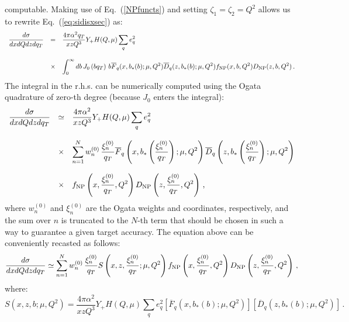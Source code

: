 \documentclass[10pt,a4paper]{article}
\begin{document}
computable. Making use of Eq.~(\ref{NPfuncts}) and setting
$\zeta_1=\zeta_2=Q^2$ allows us to rewrite Eq.~(\ref{eq:sidisxsec})
as:
\begin{equation}
\begin{array}{rcl}
\displaystyle   \frac{d\sigma}{dxdQdz d q_{T}} &=&\displaystyle
\frac{4\pi \alpha^2q_{T}}{xzQ^3}Y_+ H(Q,\mu) \sum_q e_q^2\\
\\
&\times&\displaystyle 
  \int_0^\infty db\, J_0\left(bq_T\right) \,b\overline{F}_q(x,b_*(b);\mu,Q^2) \overline{D}_q(z,b_*(b);\mu,Q^2) f_{\rm NP}(x,b,Q^2) D_{\rm NP}(z,b,Q^2)\,.
\end{array}
\label{eq:sidisxsec3}
\end{equation}
The integral in the r.h.s. can be numerically computed using the Ogata
quadrature of zero-th degree (because $J_0$ enters the integral):
\begin{equation}
\begin{array}{rcl}
\displaystyle   \frac{d\sigma}{dxdQdz d q_{T}} &\simeq&\displaystyle
\frac{4\pi \alpha^2}{xzQ^3}Y_+ H(Q,\mu) \sum_q e_q^2\\
\\
&\times&\displaystyle
  \sum_{n=1}^{N}w_n^{(0)}\,\frac{\xi_n^{(0)}}{q_{T}}\overline{F}_q\left(x,b_*\left(\frac{\xi_n^{(0)}}{q_{T}}\right);\mu,Q^2\right)
         \overline{D}_q\left(z,b_*\left(\frac{\xi_n^{(0)}}{q_{T}}\right);\mu,Q^2\right)\\
\\
&\times& \displaystyle f_{\rm NP}\left(x, \frac{\xi_n^{(0)}}{q_{T}},Q^2\right) D_{\rm NP}\left(z, \frac{\xi_n^{(0)}}{q_{T}},Q^2\right)\,,
\end{array}
\end{equation}
where $w_n^{(0)}$ and $\xi_n^{(0)}$ are the Ogata weights and
coordinates, respectively, and the sum over $n$ is truncated to the
$N$-th term that should be chosen in such a way to guarantee a given
target accuracy. The equation above can be conveniently recasted as
follows:
\begin{equation}
\displaystyle \frac{d\sigma}{dxdQdz d q_{T}} \simeq
  \sum_{n=1}^{N}w_n^{(0)}\,\frac{\xi_n^{(0)}}{q_{T}}S\left(x,z,\frac{\xi_n^{(0)}}{q_{T}};\mu,Q^2\right) f_{\rm NP}\left(x, \frac{\xi_n^{(0)}}{q_{T}},Q^2\right) D_{\rm NP}\left(z, \frac{\xi_n^{(0)}}{q_{T}},Q^2\right)\,,
\end{equation}
where:
\begin{equation}
\displaystyle S\left(x,z,b;\mu,Q^2\right)=
\frac{4\pi \alpha^2}{xzQ^3}Y_+ H(Q,\mu) \sum_q e_q^2
\left[\overline{F}_q\left(x,b_*(b);\mu,Q^2\right)\right]\left[\overline{D}_q\left(z,b_*(b);\mu,Q^2\right)\right]\,.
\label{eq:Sall}
\end{equation}
\end{document}
